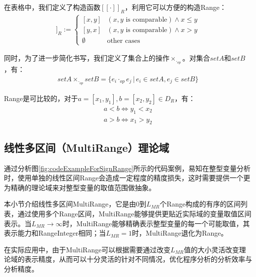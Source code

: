 在表格中，我们定义了构造函数$ [[\cdot]]_R $，利用它可以方便的构造Range：
\begin{align}
[[x, y]]_R := \begin{cases}
[x, y] & (x, y \text{ is comparable}) \land x \le y\\
[y, x] & (x, y \text{ is comparable}) \land x > y\\
\emptyset & \text{other cases}
\end{cases}
\end{align}

同时，为了进一步简化书写，我们定义了集合上的操作$ \times_{\cdot_{op}} $。对集合$ setA $和$ setB $，有：
\begin{align}
setA  \times_{\cdot_{op}} setB =  \{ e_i \cdot_{op} e_j \, | \, e_i \in setA, e_j \in setB \} 
\end{align}

Range是可比较的，对于$ a = [x_1, y_1], b = [x_2, y_2] \in D_R $，有：
\begin{align}
	a < b \iff y_1 < x_2\\
	a > b \iff x_1 > y_2
\end{align}

\subsection{线性多区间（MultiRange）理论域}
\label{sec:MultiRange}

通过分析图\ref{fig:codeExampleForSignRange}所示的代码案例，易知在整型变量分析时，使用单独的线性区间Range会造成一定程度的精度损失，这时需要提供一个更为精确的理论域来对整型变量的取值范围做抽象。

本小节介绍线性多区间MultiRange，它是由0到$ L_{MR} $个Range构成的有序的区间列表，通过使用多个Range区间，MultiRange能够提供更贴近实际域的变量取值区间表示。当$ L_{MR}  \rightarrow \infty $时，MultiRange能够精确表示整型变量的每一个可能取值，其表示能力和RangeInteger相同；当$ L_{MR} = 1 $时，MultiRange退化为Range。

在实际应用中，由于MultiRange可以根据需要通过改变$ L_{MR} $值的大小灵活改变理论域的表示精度，从而可以十分灵活的针对不同情况，优化程序分析的分析效率与分析精度。

